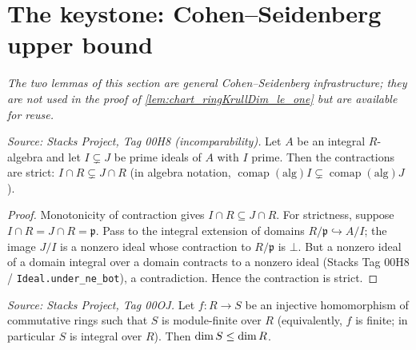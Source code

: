 \section{The keystone: Cohen--Seidenberg upper bound}

\emph{The two lemmas of this section are general Cohen--Seidenberg infrastructure;
they are not used in the proof of \cref{lem:chart_ringKrullDim_le_one} but are
available for reuse.}

\begin{lemma}
  \label{lem:comap_lt_comap_of_isIntegral}
  \textit{Source: Stacks Project, Tag 00H8 (incomparability).}
  Let \(A\) be an integral \(R\)-algebra and let \(I \subsetneq J\) be prime ideals of
  \(A\) with \(I\) prime.  Then the contractions are strict:
  \(I \cap R \subsetneq J \cap R\) (in algebra notation,
  \(\operatorname{comap}(\mathrm{alg}) I \subsetneq \operatorname{comap}(\mathrm{alg})
  J\)).
\end{lemma}

\begin{proof}\leanok
  Monotonicity of contraction gives \(I \cap R \subseteq J \cap R\).  For strictness,
  suppose \(I \cap R = J \cap R = \mathfrak p\).  Pass to the integral extension of
  domains \(R/\mathfrak p \hookrightarrow A/I\); the image \(J/I\) is a nonzero ideal
  whose contraction to \(R/\mathfrak p\) is \(\bot\).  But a nonzero ideal of a domain
  integral over a domain contracts to a nonzero ideal (Stacks Tag 00H8 /
  \texttt{Ideal.under\_ne\_bot}), a contradiction.  Hence the contraction is strict.
\end{proof}


\begin{lemma}
  \label{lem:ringKrullDim_le_of_moduleFinite_injective}
  \textit{Source: Stacks Project, Tag 00OJ.}
  Let \(f : R \to S\) be an injective homomorphism of commutative rings such that
  \(S\) is module-finite over \(R\) (equivalently, \(f\) is finite; in particular
  \(S\) is integral over \(R\)).  Then \(\dim S \le \dim R\).
\end{lemma}

